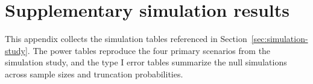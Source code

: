 \section{Supplementary simulation results}\label{app:supplementary-simulation-results}

This appendix collects the simulation tables referenced in Section~\ref{sec:simulation-study}. The power tables reproduce the four primary scenarios from the simulation study, and the type I error tables summarize the null simulations across sample sizes and truncation probabilities.





